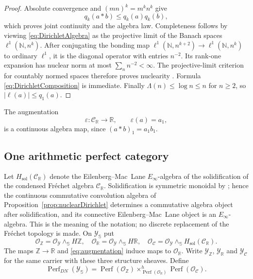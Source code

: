 \documentclass[11pt]{amsart}
\theoremstyle{definition}
\theoremstyle{remark}
\newcommand{\R}{\mathbb R}
\newcommand{\N}{\mathbb N}
\newcommand{\Z}{\mathbb Z}
\begin{document}
\begin{proof}
Absolute convergence and $(mn)^k=m^kn^k$ give
\[
 q_k(a*b)\leq q_k(a)q_k(b),
\]
which proves joint continuity and the algebra law.  Completeness follows by
viewing \eqref{eq:DirichletAlgebra} as the projective limit of the Banach
spaces $\ell^1(\N,n^k)$.  After conjugating the bonding map
$\ell^1(\N,n^{k+2})\to\ell^1(\N,n^k)$ to ordinary $\ell^1$, it is the
diagonal operator with entries $n^{-2}$.  Its rank-one expansion has nuclear
norm at most $\sum_nn^{-2}<\infty$.  The projective-limit criterion for
countably normed spaces therefore proves nuclearity
\cite[Chapter~4]{PietschNuclear}.  Formula
\eqref{eq:DirichletComposition} is immediate.  Finally
$\Lambda(n)\leq\log n\leq n$ for $n\geq2$, so
$|\ell(a)|\leq q_1(a)$.
\end{proof}

The augmentation
\begin{equation}\label{eq:augmentation}
 \varepsilon:\mathcal C_{\R}\longrightarrow\R,\qquad
 \varepsilon(a)=a_1,
\end{equation}
is a continuous algebra map, since $(a*b)_1=a_1b_1$.

\subsection{One arithmetic perfect category}

Let $H_{\mathrm{sol}}(\mathcal C_{\R})$ denote the Eilenberg--Mac~Lane
$E_\infty$-algebra of the solidification of the condensed Fr\'echet algebra
$\mathcal C_{\R}$.  Solidification is symmetric monoidal by
\cite[Theorem~6.2]{ClausenScholze}; hence the continuous commutative
convolution algebra of Proposition~\ref{prop:nuclearDirichlet} determines a
commutative algebra object after solidification, and its connective
Eilenberg--Mac~Lane object is an $E_\infty$-algebra.  This is the meaning of
the notation; no discrete replacement of the Fr\'echet topology is made.
On $\mathscr Y_{\mathbb S}$ put
\begin{equation}\label{eq:threeStructures}
 \mathcal O_{\Z}=\mathcal O_{\mathscr Y}\wedge_{\mathbb S}H\Z,
 \quad
 \mathcal O_{\R}=\mathcal O_{\mathscr Y}\wedge_{\mathbb S}H\R,
 \quad
 \mathcal O_{\mathcal C}=\mathcal O_{\mathscr Y}
        \wedge_{\mathbb S}H_{\mathrm{sol}}(\mathcal C_{\R}).
\end{equation}
The maps $\Z\to\R$ and \eqref{eq:augmentation} induce maps to
$\mathcal O_{\R}$.  Write $\mathscr Y_{\Z}$,
$\mathscr Y_{\R}$ and $\mathscr Y_{\mathcal C}$ for the same carrier with
these three structure sheaves.  Define
\begin{equation}\label{eq:PerfDN}
 \operatorname{Perf}_{DN}(\mathscr Y_{\mathbb S})=
 \operatorname{Perf}(\mathcal O_{\Z})
 \times^h_{\operatorname{Perf}(\mathcal O_{\R})}
 \operatorname{Perf}(\mathcal O_{\mathcal C}).
\end{equation}
\end{document}
